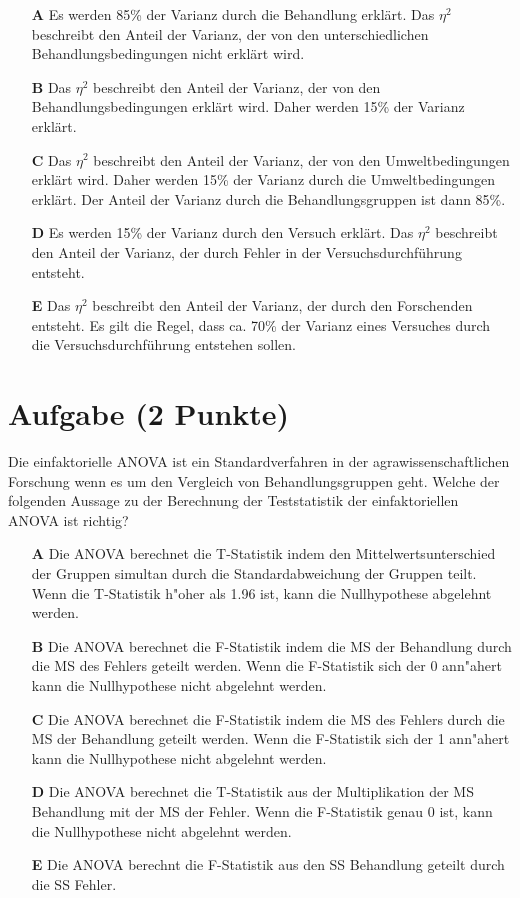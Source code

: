 \documentclass[a4paper, 9pt]{scrartcl}\usepackage[]{graphicx}\usepackage[]{xcolor}
\begin{document}
\begin{enumerate}
\item [\textbf{A} \msquare] Es werden 85\% der Varianz durch die Behandlung erklärt. Das $\eta^2$ beschreibt den Anteil der Varianz, der von den unterschiedlichen Behandlungsbedingungen nicht erklärt wird.
\item [\textbf{B} \msquare] Das $\eta^2$ beschreibt den Anteil der Varianz, der von den Behandlungsbedingungen erklärt wird. Daher werden 15\% der Varianz erklärt.
\item [\textbf{C} \msquare] Das $\eta^2$ beschreibt den Anteil der Varianz, der von den Umweltbedingungen erklärt wird. Daher werden 15\% der Varianz durch die Umweltbedingungen erklärt. Der Anteil der Varianz durch die Behandlungsgruppen ist dann 85\%.
\item [\textbf{D} \msquare] Es werden 15\% der Varianz durch den Versuch erklärt. Das $\eta^2$ beschreibt den Anteil der Varianz, der durch Fehler in der Versuchsdurchführung entsteht.
\item [\textbf{E} \msquare] Das $\eta^2$ beschreibt den Anteil der Varianz, der durch den Forschenden entsteht. Es gilt die Regel, dass ca. 70\% der Varianz eines Versuches durch die Versuchsdurchführung entstehen sollen.
\end{enumerate} 

\section{Aufgabe \hfill (2 Punkte)}



Die einfaktorielle ANOVA ist ein Standardverfahren in der agrawissenschaftlichen Forschung wenn es um den Vergleich von Behandlungsgruppen geht. Welche der folgenden Aussage zu der Berechnung der Teststatistik der einfaktoriellen ANOVA ist richtig?



\begin{enumerate}
\item [\textbf{A} \msquare] Die ANOVA berechnet die T-Statistik indem den Mittelwertsunterschied der Gruppen simultan durch die Standardabweichung der Gruppen teilt. Wenn die T-Statistik h{"o}her als 1.96 ist, kann die Nullhypothese abgelehnt werden.
\item [\textbf{B} \msquare] Die ANOVA berechnet die F-Statistik indem die MS der Behandlung durch die MS des Fehlers geteilt werden. Wenn die F-Statistik sich der 0 ann{"a}hert kann die Nullhypothese nicht abgelehnt werden.
\item [\textbf{C} \msquare] Die ANOVA berechnet die F-Statistik indem die MS des Fehlers durch die MS der Behandlung geteilt werden. Wenn die F-Statistik sich der 1 ann{"a}hert kann die Nullhypothese nicht abgelehnt werden.
\item [\textbf{D} \msquare] Die ANOVA berechnet die T-Statistik aus der Multiplikation der MS Behandlung mit der MS der Fehler. Wenn die F-Statistik genau 0 ist, kann die Nullhypothese nicht abgelehnt werden.
\item [\textbf{E} \msquare] Die ANOVA berechnt die F-Statistik aus den SS Behandlung geteilt durch die SS Fehler.
\end{enumerate} 
\end{document}

